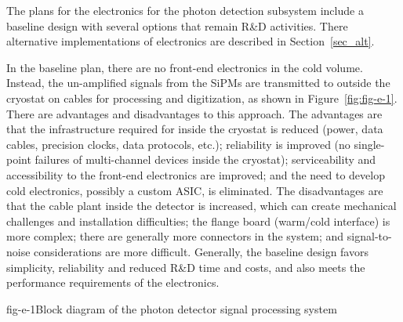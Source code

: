 %
The plans for the electronics for the photon detection subsystem
include a baseline design with several options that remain R\&D
activities.  There alternative implementations of electronics are
described in Section~\ref{sec_alt}.

In the baseline plan, there are no front-end electronics in the cold
volume.  Instead, the un-amplified signals from the SiPMs are
transmitted to outside the cryostat on cables for processing and
digitization, as shown in Figure~\ref{fig:fig-e-1}.  There are
advantages and disadvantages to this approach.  The advantages are
that the infrastructure required for inside the cryostat is reduced
(power, data cables, precision clocks, data protocols, etc.);
reliability is improved (no single-point failures of multi-channel
devices inside the cryostat); serviceability and accessibility to the
front-end electronics are improved; and the need to develop cold
electronics, possibly a custom ASIC, is eliminated.  The disadvantages
are that the cable plant inside the detector is increased, which can
create mechanical challenges and installation difficulties; the flange
board (warm/cold interface) is more complex; there are generally more
connectors in the system; and signal-to-noise considerations are more
difficult.  Generally, the baseline design favors simplicity,
reliability and reduced R\&D time and costs, and also meets the
performance requirements of the electronics.
%
%
\begin{cdrfigure}{fig-e-1}{Block diagram of the photon detector signal processing system}
\end{cdrfigure}

